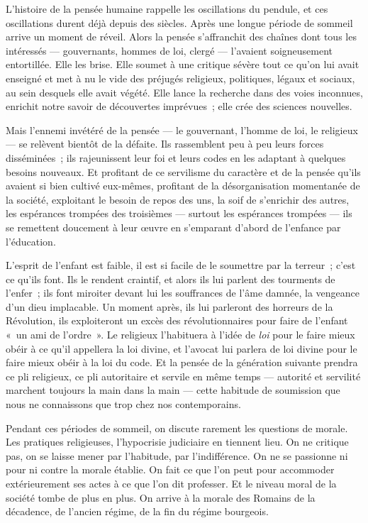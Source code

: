 \documentclass[french,twoside]{book} %
\begin{document}
\noindent L’histoire de la pensée humaine rappelle les oscillations du pendule, et ces oscillations durent déjà depuis des siècles. Après une longue période de sommeil arrive un moment de réveil. Alors la pensée s’affranchit des chaînes dont tous les intéressés — gouvernants, hommes de loi, clergé — l’avaient soigneusement entortillée. Elle les brise. Elle soumet à une critique sévère tout ce qu’on lui avait enseigné et met à nu le vide des préjugés religieux, politiques, légaux et sociaux, au sein desquels elle avait végété. Elle lance la recherche dans des voies inconnues, enrichit notre savoir de découvertes imprévues ; elle crée des sciences nouvelles.\par
Mais l’ennemi invétéré de la pensée — le gouvernant, l’homme de loi, le religieux — se relèvent bientôt de la défaite. Ils rassemblent peu à peu leurs forces disséminées ; ils rajeunissent leur foi et leurs codes en les adaptant à quelques besoins nouveaux. Et profitant de ce servilisme du caractère et de la pensée qu’ils avaient si bien cultivé eux-mêmes, profitant de la désorganisation momentanée de la société, exploitant le besoin de repos des uns, la soif de s’enrichir des autres, les espérances trompées des troisièmes — surtout les espérances trompées — ils se remettent doucement à leur œuvre en s’emparant d’abord de l’enfance par l’éducation.\par
L’esprit de l’enfant est faible, il est si facile de le soumettre par la terreur ; c’est ce qu’ils font. Ils le rendent craintif, et alors ils lui parlent des tourments de l’enfer ; ils font miroiter devant lui les souffrances de l’âme damnée, la vengeance d’un dieu implacable. Un moment après, ils lui parleront des horreurs de la Révolution, ils exploiteront un excès des révolutionnaires pour faire de l’enfant « un ami de l’ordre ». Le religieux l’habituera à l’idée de \emph{loi} pour le faire mieux obéir à ce qu’il appellera la loi divine, et l’avocat lui parlera de loi divine pour le faire mieux obéir à la loi du code. Et la pensée de la génération suivante prendra ce pli religieux, ce pli autoritaire et servile en même temps — autorité et servilité marchent toujours la main dans la main — cette habitude de soumission que nous ne connaissons que trop chez nos contemporains.\par
Pendant ces périodes de sommeil, on discute rarement les questions de morale. Les pratiques religieuses, l’hypocrisie judiciaire en tiennent lieu. On ne critique pas, on se laisse mener par l’habitude, par l’indifférence. On ne se passionne ni pour ni contre la morale établie. On fait ce que l’on peut pour accommoder extérieurement ses actes à ce que l’on dit professer. Et le niveau moral de la société tombe de plus en  plus. On arrive à la morale des Romains de la décadence, de l’ancien régime, de la fin du régime bourgeois.\par
\end{document}
